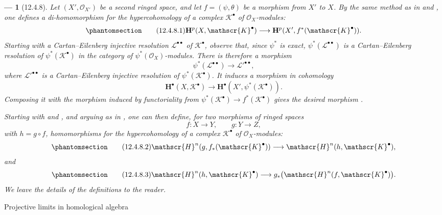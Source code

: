 \documentclass[oneside]{amsart}
\makeatletter
\theoremstyle{ega-env-style}
\newtheorem*{env}{---}
\theoremstyle{ega-thm-env-style}
\theoremstyle{ega-defn-env-style}
\def\section{\@startsection{section}{1}%
  \z@{.7\linespacing\@plus\linespacing}{.5\linespacing}%
  {\normalfont\bfseries\Large\scshape\centering}}
\def\mathcal{\mathscr}
\def\sh{\mathcal}                   %
\def\bb{\mathbf}                    %
\let\EGAOriginalLabel\label
\renewcommand{\label}[1]{\phantomsection\EGAOriginalLabel{#1}}
\makeatother
\begin{document}
\begin{env}[12.4.8]
\label{0.12.4.8}
Let $(X',\sh{O}_{X'})$ be a second ringed space, and let
$f=(\psi,\theta)$ be a morphism from $X'$ to $X$.
By the same method as in  and , one
defines a di-homomorphism for the hypercohomology of a complex
$\sh{K}^\bullet$ of $\sh{O}_X$-modules:
\begin{equation}
\label{0.12.4.8.1}
\tag{12.4.8.1}
  \bb{H}^p(X,\sh{K}^\bullet)
  \longrightarrow
  \bb{H}^p(X',f^*(\sh{K}^\bullet)).
\end{equation}
Starting with a Cartan--Eilenberg injective resolution
$\sh{L}^{\bullet\bullet}$ of $\sh{K}^\bullet$, observe that, since
$\psi^*$ is exact, $\psi^*(\sh{L}^{\bullet\bullet})$ is a
Cartan--Eilenberg resolution of $\psi^*(\sh{K}^\bullet)$ in the
category of $\psi^*(\sh{O}_X)$-modules.
There is therefore a morphism
\[
  \psi^*(\sh{L}^{\bullet\bullet})
  \longrightarrow
  {\sh{L}'}^{\bullet\bullet},
\]
where ${\sh{L}'}^{\bullet\bullet}$ is a Cartan--Eilenberg injective
resolution of $\psi^*(\sh{K}^\bullet)$.
It induces a morphism in cohomology
\[
  \bb{H}^\bullet(X,\sh{K}^\bullet)
  \longrightarrow
  \bb{H}^\bullet
  (X',\psi^*(\sh{K}^\bullet)).
\]
Composing it with the morphism induced by functoriality from
$\psi^*(\sh{K}^\bullet)\longrightarrow f^*(\sh{K}^\bullet)$ gives
the desired morphism .

Starting with  and , and arguing as
in , one can then define, for two morphisms of ringed
spaces
\[
  f:X\longrightarrow Y,
  \qquad
  g:Y\longrightarrow Z,
\]
with $h=g\circ f$, homomorphisms for the hypercohomology of a complex
$\sh{K}^\bullet$ of $\sh{O}_X$-modules:
\begin{equation}
\label{0.12.4.8.2}
\tag{12.4.8.2}
  \sh{H}^n(g,f_*(\sh{K}^\bullet))
  \longrightarrow
  \sh{H}^n(h,\sh{K}^\bullet),
\end{equation}
and
\begin{equation}
\label{0.12.4.8.3}
\tag{12.4.8.3}
  \sh{H}^n(h,\sh{K}^\bullet)
  \longrightarrow
  g_*\bigl(\sh{H}^n(f,\sh{K}^\bullet)\bigr).
\end{equation}
We leave the details of the definitions to the reader.
\end{env}
\section{Projective limits in homological algebra}
\label{section:0.13}
\end{document}
